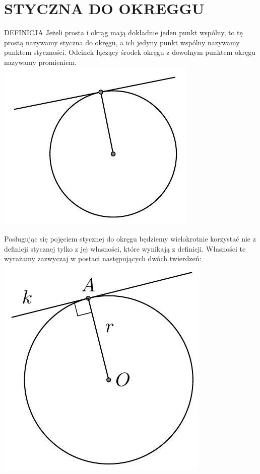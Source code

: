 \documentclass[10pt]{article}
\begin{document}
\section*{STYCZNA DO OKREGGU}
DEFINICJA Jeżeli prosta i okrąg mają dokładnie jeden punkt wspólny, to tę prostą nazywamy styczna do okręgu, a ich jedyny punkt wspólny nazywamy punktem styczności. Odcinek łączący środek okręgu z dowolnym punktem okręgu nazywamy promieniem.\\
\includegraphics[max width=\textwidth, center]{2024_11_21_e9b4faa005d5be2cc318g-032(1)}

Posługując się pojęciem stycznej do okręgu będziemy wielokrotnie korzystać nie z definicji stycznej tylko z jej własności, które wynikają z definicji. Własności te wyrażamy zazwyczaj w postaci następujących dwóch twierdzeń:\\
\includegraphics[max width=\textwidth, center]{2024_11_21_e9b4faa005d5be2cc318g-032}
\end{document}
